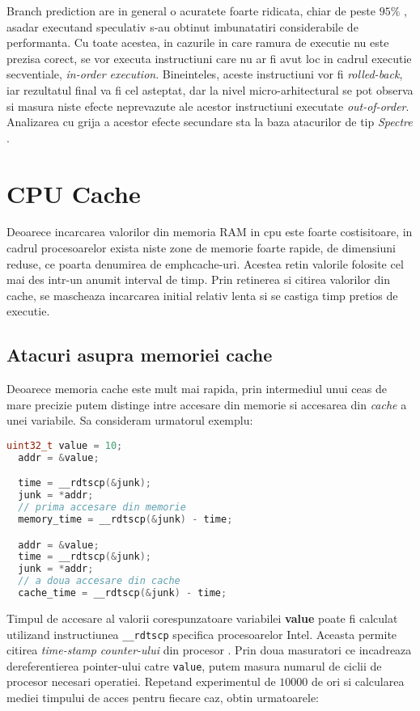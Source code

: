 Branch prediction are in general o acuratete foarte ridicata, chiar de peste $95\%$ \cite{what_is_speculative_execution}, asadar executand speculativ s-au obtinut
imbunatatiri considerabile de performanta. Cu toate acestea, in cazurile in care
ramura de executie nu este prezisa corect, se vor executa instructiuni care nu ar
fi avut loc in cadrul executie secventiale, \emph{in-order execution}. Bineinteles,
aceste instructiuni vor fi \emph{rolled-back}, iar rezultatul final va fi cel asteptat,
dar la nivel micro-arhitectural se pot observa si masura niste efecte neprevazute ale
acestor instructiuni executate \emph{out-of-order}. Analizarea cu grija a acestor efecte
secundare sta la baza atacurilor de tip \emph{Spectre} \cite{spectre2019}.


\section{CPU Cache}

Deoarece incarcarea valorilor din memoria RAM in cpu este foarte costisitoare, in 
cadrul procesoarelor exista niste zone de memorie foarte rapide, de dimensiuni reduse, 
ce poarta denumirea de emph{cache-uri}. Acestea retin valorile folosite cel mai des 
intr-un anumit interval de timp. Prin retinerea si citirea valorilor din cache,
se mascheaza incarcarea initial relativ lenta si se castiga timp pretios de executie.


\subsection{Atacuri asupra memoriei cache}

Deoarece memoria cache este mult mai rapida, prin intermediul unui ceas de mare precizie
putem distinge intre accesare din memorie si accesarea din \emph{cache} a unei variabile.
Sa consideram urmatorul exemplu:

\begin{lstlisting}[language=c]
  uint32_t value = 10;
  addr = &value;

  time = __rdtscp(&junk);
  junk = *addr;
  // prima accesare din memorie
  memory_time = __rdtscp(&junk) - time;

  addr = &value;
  time = __rdtscp(&junk);
  junk = *addr;
  // a doua accesare din cache
  cache_time = __rdtscp(&junk) - time;
\end{lstlisting}


Timpul de accesare al valorii corespunzatoare variabilei \textbf{value} poate
fi calculat utilizand instructiunea \texttt{\_\_rdtscp} specifica procesoarelor
Intel. Aceasta permite citirea \emph{time-stamp counter-ului} din procesor
\cite{rdtscp}. Prin doua masuratori ce incadreaza dereferentierea pointer-ului
catre \texttt{value}, putem masura numarul de ciclii de procesor necesari
operatiei. Repetand experimentul de $10000$ de ori si calcularea mediei
timpului de acces pentru fiecare caz, obtin urmatoarele:

